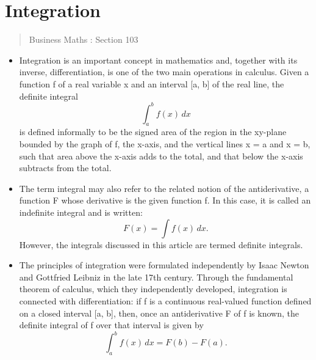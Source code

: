 \documentclass[12pt]{article}
\begin{document}
\section{Integration}
\begin{abstract}
Business Maths : Section 103
\end{abstract}
\begin{itemize}
\item Integration is an important concept in mathematics and, together with its inverse, differentiation, is one of the two main operations in calculus. Given a function f of a real variable x and an interval [a, b] of the real line, the definite integral
\[\int_a^b \! f(x)\,dx\]
is defined informally to be the signed area of the region in the xy-plane bounded by the graph of f, the x-axis, and the vertical lines x = a and x = b, such that area above the x-axis adds to the total, and that below the x-axis subtracts from the total.
\item The term integral may also refer to the related notion of the antiderivative, a function F whose derivative is the given function f. In this case, it is called an indefinite integral and is written:
\[F(x) = \int f(x)\,dx.\]
However, the integrals discussed in this article are termed definite integrals.
\item The principles of integration were formulated independently by Isaac Newton and Gottfried Leibniz in the late 17th century. Through the fundamental theorem of calculus, which they independently developed, integration is connected with differentiation: if f is a continuous real-valued function defined on a closed interval [a, b], then, once an antiderivative F of f is known, the definite integral of f over that interval is given by
\[\int_a^b \! f(x)\,dx = F(b) - F(a).\]
\end{itemize}
\end{document}

